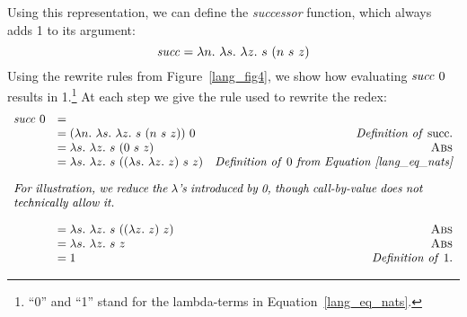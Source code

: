 \documentclass[12pt]{report}
\begin{document}
Using this representation, we can define the \emph{successor}
function, which always adds 1 to its argument:
\begin{equation}
  \mathit{succ} = \lambda n.\ \lambda s.\ \lambda z.\ s\ (n\ s\ z)
\end{equation}
Using the rewrite rules from Figure~\ref{lang_fig4}, we show how
evaluating $\mathit{succ}\ 0$ results in 1.\footnote{``0''
  and ``1'' stand for the lambda-terms in
  Equation~\ref{lang_eq_nats}.} At each step we give the rule used to
rewrite the redex:
\begin{equation*}
  \begin{array}{rlr}
    \lamApp{\mathit{succ}}{0} &= \\ 
    &= \lamAppP{\lamAbs{n}{\lamAbs{s}{\lamAbs{z}{\lamApPp{s}{\lamApp{n}{\lamApp{s}{z}}}}}}}{0} & \text{\emph{Definition of} succ.} \\
    &= \lamAbs{s}{\lamAbs{z}{\lamApPp{s}{\lamApp{0}{\lamApp{s}{z}}}}} & \text{\sc Abs} \\
    &= \lamAbs{s}{\lamAbs{z}{\lamApPp{s}{\lamAppP{\lamAbs{s}{\lamAbs{z}{z}}}{\lamApp{s}{z}}}}} & \text{\emph{Definition of}\ 0 \emph{from Equation~\ref{lang_eq_nats}}} \\ \\
    \multicolumn{3}{l}{\parbox[c]{\linewidth}{\emph{For illustration, we reduce the $\lambda$'s introduced by 0, though call-by-value does not technically allow it.}}} \\ \\
    &= \lamAbs{s}{\lamAbs{z}{\lamApPp{s}{\lamAppP{\lamAbs{z}{z}}{z}}}}  & \text{\sc Abs} \\
    &= \lamAbs{s}{\lamAbs{z}{\lamApp{s}{z}}}  & \text{\sc Abs} \\
    &= 1 & \text{\emph{Definition of}\ 1.}
  \end{array}
\end{equation*}
\end{document}
